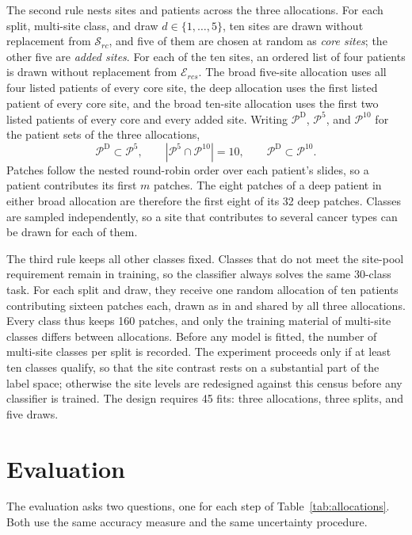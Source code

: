 \documentclass[11pt]{article}
\begin{document}
The second rule nests sites and patients across the three allocations. For each split, multi-site class, and draw $d\in\{1,\ldots,5\}$, ten sites are drawn without replacement from $\mathcal S_{rc}$, and five of them are chosen at random as \emph{core sites}; the other five are \emph{added sites}. For each of the ten sites, an ordered list of four patients is drawn without replacement from $\mathcal E_{rcs}$. The broad five-site allocation uses all four listed patients of every core site, the deep allocation uses the first listed patient of every core site, and the broad ten-site allocation uses the first two listed patients of every core and every added site. Writing $\mathcal P^{\mathrm D}$, $\mathcal P^{5}$, and $\mathcal P^{10}$ for the patient sets of the three allocations,
\begin{equation}
 \mathcal P^{\mathrm D}\subset\mathcal P^{5},
 \qquad
 |\mathcal P^{5}\cap\mathcal P^{10}|=10,
 \qquad
 \mathcal P^{\mathrm D}\subset\mathcal P^{10}.
 \label{eq:nesting}
\end{equation}
\noindent Patches follow the nested round-robin order over each patient's slides, so a patient contributes its first $m$ patches. The eight patches of a deep patient in either broad allocation are therefore the first eight of its 32 deep patches. Classes are sampled independently, so a site that contributes to several cancer types can be drawn for each of them.

The third rule keeps all other classes fixed. Classes that do not meet the site-pool requirement remain in training, so the classifier always solves the same 30-class task. For each split and draw, they receive one random allocation of ten patients contributing sixteen patches each, drawn as in \citet{queisler2026effectiveSupport} and shared by all three allocations. Every class thus keeps 160 patches, and only the training material of multi-site classes differs between allocations. Before any model is fitted, the number of multi-site classes per split is recorded. The experiment proceeds only if at least ten classes qualify, so that the site contrast rests on a substantial part of the label space; otherwise the site levels are redesigned against this census before any classifier is trained. The design requires 45 fits: three allocations, three splits, and five draws.

\section{Evaluation}
\label{sec:evaluation}
The evaluation asks two questions, one for each step of Table~\ref{tab:allocations}. Both use the same accuracy measure and the same uncertainty procedure.
\end{document}
